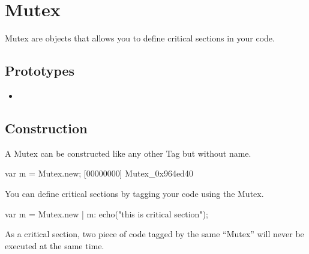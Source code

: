 \section{Mutex}

Mutex are objects that allows you to define critical sections in your code.

\subsection{Prototypes}
\begin{itemize}
\item {}
\end{itemize}

\subsection{Construction}
A Mutex can be constructed like any other Tag but without name.

\begin{urbiscript}
var m = Mutex.new;
[00000000] Mutex_0x964ed40
\end{urbiscript}

You can define critical sections by tagging your code using the Mutex.

\begin{urbiscript}
var m = Mutex.new | {}
m: echo("this is critical section");
\end{urbiscript}

As a critical section, two piece of code tagged by the same ``Mutex'' will never be executed at the same time.

